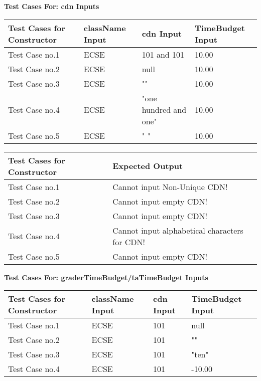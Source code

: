 \documentclass[12pt]{report}
\begin{document}
	\textbf{Test Cases For: cdn Inputs}
	\begin{flushleft}
		\begin{tabular}{ | l | l | l | l | }
			\hline
			Test Cases for Constructor & className Input & cdn Input & TimeBudget Input \\ \hline
			Test Case no.1 & ECSE & 101 and 101 & 10.00 \\ \hline
			Test Case no.2 & ECSE & null & 10.00 \\ \hline
			Test Case no.3 & ECSE & "" & 10.00 \\ \hline
			Test Case no.4 & ECSE & "one hundred and one" & 10.00 \\ \hline
			Test Case no.5 & ECSE & " " & 10.00 \\ \hline
		\end{tabular}
	\end{flushleft}
	
	\begin{flushleft}
		\begin{tabular}{ | l | l | }
			\hline
			Test Cases for Constructor & Expected Output \\ \hline
			Test Case no.1 & Cannot input Non-Unique CDN! \\ \hline
			Test Case no.2 & Cannot input empty CDN! \\ \hline
			Test Case no.3 & Cannot input empty CDN! \\ \hline
			Test Case no.4 & Cannot input alphabetical characters for CDN!  \\ \hline
			Test Case no.5 & Cannot input empty CDN!  \\ \hline			
		\end{tabular}
	\end{flushleft}

	\textbf{Test Cases For: graderTimeBudget/taTimeBudget Inputs} 
	\begin{flushleft}
		\begin{tabular}{ | l | l | l | l | }
			\hline
			Test Cases for Constructor & className Input & cdn Input & TimeBudget Input \\ \hline
			Test Case no.1 & ECSE & 101 & null \\ \hline
			Test Case no.2 & ECSE & 101 & "" \\ \hline
			Test Case no.3 & ECSE & 101 & "ten" \\ \hline
			Test Case no.4 & ECSE & 101 & -10.00 \\ \hline
		\end{tabular}
	\end{flushleft}
	
\end{document}
